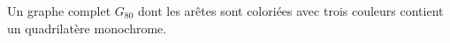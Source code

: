 Un graphe complet $G_{80}$ dont les arêtes sont coloriées avec trois couleurs contient un quadrilatère monochrome.
